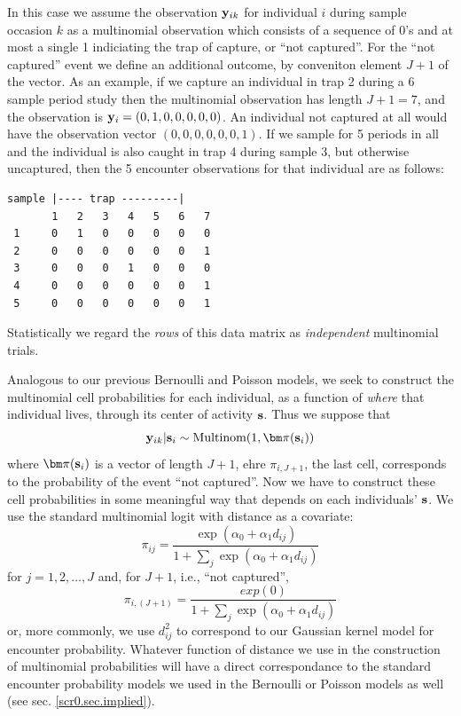 In this case we assume the observation ${\bf y}_{ik}$ for individual
$i$ during sample occasion $k$ as a multinomial observation which
consists of a sequence of 0's and at most a single 1 indiciating the
trap of capture, or ``not captured''. For the ``not captured'' event
we define an additional outcome, by conveniton element $J+1$ of the
vector.  As an example, if we capture an individual in trap 2 during a
6 sample period study then the multinomial observation has length $J+1
= 7$, and the observation is ${\bf y}_{i} = (0,1,0,0,0,0,0)$. An
individual not captured at all would have the observation vector
$(0,0,0,0,0,0,1)$.  If we sample for 5 periods in all and the
individual is also caught in trap 4 during sample 3, but otherwise
uncaptured, then the 5 encounter observations for that individual are
as follows:
\begin{verbatim}
sample |---- trap ---------|
       1   2   3   4   5   6   7
 1     0   1   0   0   0   0   0
 2     0   0   0   0   0   0   1
 3     0   0   0   1   0   0   0
 4     0   0   0   0   0   0   1
 5     0   0   0   0   0   0   1
\end{verbatim}
Statistically we regard the {\it rows} of this data matrix as {\it
  independent} multinomial trials.

Analogous to our previous Bernoulli and Poisson models, we seek to
construct the multinomial cell probabilities for each individual, as a
function of {\it where} that individual lives, through its center of
activity ${\bf s}$. Thus we suppose that
\begin{equation}
 {\bf y}_{ik}|{\bf s}_{i} \sim \mbox{Multinom}(1, {\bm \pi}({\bf s}_{i}) )
\label{poisson-mn.eq.mn}
\end{equation}
where ${\bm \pi}({\bf s}_{i})$ is a vector of length $J+1$, ehre
 $\pi_{i,J+1}$, the last cell, corresponds
 to the probability of the event ``not captured''.
Now we have to
construct these cell probabilities in some meaningful way that depends
on each individuals' ${\bf s}$.
We use the standard
multinomial logit with distance as a covariate:
\[
 \pi_{ij} = \frac{  \exp(\alpha_{0} + \alpha_{1} d_{ij}) }{ 1+ \sum_{j}
   \exp(\alpha_{0} + \alpha_{1} d_{ij})}
\]
for $j=1,2,\ldots,J$ and, for $J+1$, i.e., ``not captured'',
\[
 \pi_{i,(J+1)} = \frac{  exp(0) }
                    { 1+ \sum_{j} \exp(\alpha_{0} + \alpha_{1} d_{ij})}
\]
or, more commonly, we use $d_{ij}^{2}$ to correspond to our Gaussian
kernel model for encounter probability. Whatever function of distance
we use in the construction of multinomial probabilities will have a
direct correspondance to the standard encounter probability models we
used in the Bernoulli or Poisson models as well (see
sec. \ref{scr0.sec.implied}). 

